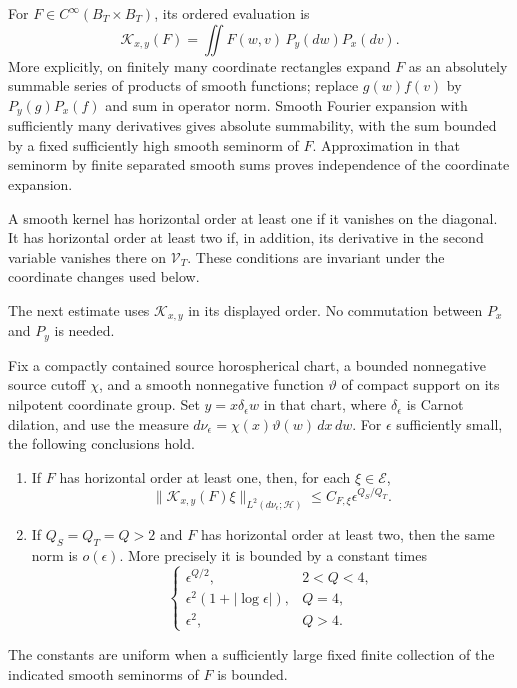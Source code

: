 \begin{definition}\label{def:scale-ordered-kernel}
For $F\in C^\infty(B_T\times B_T)$, its ordered evaluation is
\[
 \mathcal K_{x,y}(F)
 =\iint F(w,v)\,P_y(dw)P_x(dv).
\]
More explicitly, on finitely many coordinate rectangles expand $F$ as
an absolutely summable series of products of smooth functions; replace
$g(w)f(v)$ by $P_y(g)P_x(f)$ and sum in operator norm.  Smooth Fourier
expansion with sufficiently many derivatives gives absolute
summability, with the sum bounded by a fixed sufficiently high smooth
seminorm of $F$.  Approximation in that seminorm by finite separated
smooth sums proves independence of the coordinate expansion.

A smooth kernel has horizontal order at least one if it vanishes on
the diagonal.  It has horizontal order at least two if, in addition,
its derivative in the second variable vanishes there on
$\mathcal V_T$.  These conditions are invariant under the coordinate
changes used below.
\end{definition}

The next estimate uses $\mathcal K_{x,y}$ in its displayed order.
No commutation between $P_x$ and $P_y$ is needed.

\begin{lemma}\label{lem:scale-ordered-differences}
Fix a compactly contained source horospherical chart, a bounded
nonnegative source cutoff $\chi$, and a smooth nonnegative function
$\vartheta$ of compact support on its nilpotent coordinate group.  Set
$y=x\delta_\epsilon w$ in that chart, where $\delta_\epsilon$ is Carnot
dilation, and use the measure
$d\nu_\epsilon=\chi(x)\vartheta(w)\,dx\,dw$.  For $\epsilon$ sufficiently
small, the following conclusions hold.
\begin{enumerate}[label=\textup{(\roman*)}]
\item If $F$ has horizontal order at least one, then, for each
      $\xi\in\mathscr E$,
      \[
       \|\mathcal K_{x,y}(F)\xi\|_{L^2(d\nu_\epsilon;\mathcal H)}
       \le C_{F,\xi}\epsilon^{Q_S/Q_T}.
      \]
\item If $Q_S=Q_T=Q>2$ and $F$ has horizontal order at least two,
      then the same norm is $o(\epsilon)$.  More precisely it is bounded
      by a constant times
      \[
      \begin{cases}
      \epsilon^{Q/2},&2<Q<4,\\
      \epsilon^2(1+|\log\epsilon|),&Q=4,\\
      \epsilon^2,&Q>4.
      \end{cases}
      \]
\end{enumerate}
The constants are uniform when a sufficiently large fixed finite
collection of the indicated smooth seminorms of $F$ is bounded.
\end{lemma}

